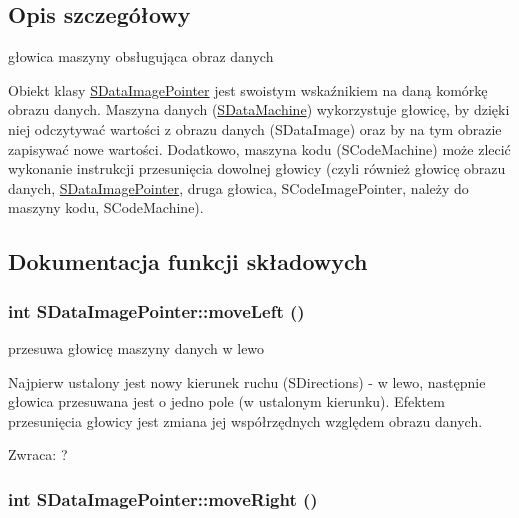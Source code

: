 \subsection{Opis szczegółowy}
głowica maszyny obsługująca obraz danych 

Obiekt klasy \hyperlink{classSDataImagePointer}{SDataImagePointer} jest swoistym wskaźnikiem na daną komórkę obrazu danych. Maszyna danych (\hyperlink{classSDataMachine}{SDataMachine}) wykorzystuje głowicę, by dzięki niej odczytywać wartości z obrazu danych (SDataImage) oraz by na tym obrazie zapisywać nowe wartości. Dodatkowo, maszyna kodu (SCodeMachine) może zlecić wykonanie instrukcji przesunięcia dowolnej głowicy (czyli również głowicę obrazu danych, \hyperlink{classSDataImagePointer}{SDataImagePointer}, druga głowica, SCodeImagePointer, należy do maszyny kodu, SCodeMachine). 

\subsection{Dokumentacja funkcji składowych}
\hypertarget{classSDataImagePointer_87bb92d4bb0336b4723c64d03df9987c}{
\subsubsection{\setlength{\rightskip}{0pt plus 5cm}int SDataImagePointer::moveLeft ()}}
\label{classSDataImagePointer_87bb92d4bb0336b4723c64d03df9987c}


przesuwa głowicę maszyny danych w lewo 

Najpierw ustalony jest nowy kierunek ruchu (SDirections) - w lewo, następnie głowica przesuwana jest o jedno pole (w ustalonym kierunku). Efektem przesunięcia głowicy jest zmiana jej współrzędnych względem obrazu danych. \begin{Desc}
\item[Zwraca:]? \end{Desc}
\hypertarget{classSDataImagePointer_9cc51881224c9e157e96d5e36189e54a}{
\subsubsection{\setlength{\rightskip}{0pt plus 5cm}int SDataImagePointer::moveRight ()}}
\label{classSDataImagePointer_9cc51881224c9e157e96d5e36189e54a}


